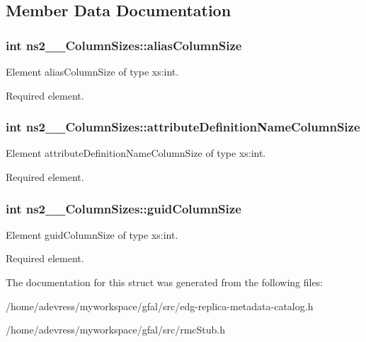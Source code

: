 \subsection{Member Data Documentation}
\subsubsection{\setlength{\rightskip}{0pt plus 5cm}int \bf{ns2\_\-\_\-Column\-Sizes::alias\-Column\-Size}}\label{structns2____ColumnSizes_2a8800420ff4f0d85c0369b29f0ded69}


Element alias\-Column\-Size of type xs:int. 

Required element. 
\subsubsection{\setlength{\rightskip}{0pt plus 5cm}int \bf{ns2\_\-\_\-Column\-Sizes::attribute\-Definition\-Name\-Column\-Size}}\label{structns2____ColumnSizes_9ecf64a73b2915d27e14620b0189b42a}


Element attribute\-Definition\-Name\-Column\-Size of type xs:int. 

Required element. 
\subsubsection{\setlength{\rightskip}{0pt plus 5cm}int \bf{ns2\_\-\_\-Column\-Sizes::guid\-Column\-Size}}\label{structns2____ColumnSizes_957af3eedc4d466d1e0b36167ba8d095}


Element guid\-Column\-Size of type xs:int. 

Required element. 

The documentation for this struct was generated from the following files:\begin{CompactItemize}
\item 
/home/adevress/myworkspace/gfal/src/edg-replica-metadata-catalog.h\item 
/home/adevress/myworkspace/gfal/src/rmc\-Stub.h\end{CompactItemize}
